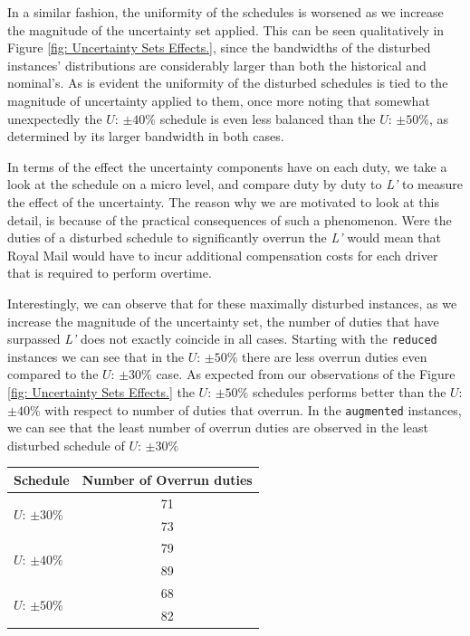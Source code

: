 \vspace{\baselineskip}
\noindent
In a similar fashion, the uniformity of the schedules is worsened as we increase the magnitude of the uncertainty set applied. This can be seen qualitatively in Figure \ref{fig: Uncertainty Sets Effects.}, since the bandwidths of the disturbed instances' distributions are considerably larger than both the historical and nominal's. As is evident the uniformity of the disturbed schedules is tied to the magnitude of uncertainty applied to them, once more noting that somewhat unexpectedly the $U$: $\pm40\%$ schedule is even less balanced than the $U$: $\pm50\%$, as determined by its larger bandwidth in both cases.

\vspace{\baselineskip}
\noindent
In terms of the effect the uncertainty components have on each duty, we take a look at the schedule on a micro level, and compare duty by duty to \textit{L'} to measure the effect of the uncertainty. The reason why we are motivated to look at this detail, is because of the practical consequences of such a phenomenon. Were the duties of a disturbed schedule to significantly overrun the \textit{L'} would mean that Royal Mail would have to incur additional compensation costs for each driver that is required to perform overtime. 

\vspace{\baselineskip}
\noindent
Interestingly, we can observe that for these maximally disturbed instances, as we increase the magnitude of the uncertainty set, the number of duties that have surpassed \textit{L'} does not exactly coincide in all cases. Starting with the \texttt{reduced} instances we can see that in the $U$: $\pm50\%$ there are less overrun duties even compared to the $U$: $\pm30\%$ case. As expected from our observations of the Figure \ref{fig: Uncertainty Sets Effects.} the $U$: $\pm50\%$ schedules performs better than the $U$: $\pm40\%$ with respect to number of duties that overrun. In the \texttt{augmented} instances, we can see that the least number of overrun duties are observed in the least disturbed schedule of $U$: $\pm30\%$


\begin{table}[h]
\small
    \centering 
\begin{tabular}{l|c}
 \centering 
        \textbf{Schedule} & \textbf{Number of Overrun duties} \\
        \hline
        \multirow{2}{*}{$U$: $\pm30\%$} & 71\\ 
        \cline{2-2}
        & 73 \\
        \hline
        \multirow{2}{*}{$U$: $\pm40\%$} & 79\\ 
        \cline{2-2}
        & 89 \\
        \hline
        \multirow{2}{*}{$U$: $\pm50\%$} & 68\\     
        \cline{2-2}
        & 82 \\
\end{tabular}
\end{table}

